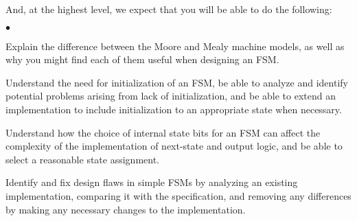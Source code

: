 And, at the highest level, we expect that you will be able to do the following:

\begin{list}{$\bullet$}{\setlength{\itemsep}{0pt}\setlength{\parskip}{0pt}%
\setlength{\topsep}{0pt}\setlength{\partopsep}{0pt}\setlength{\parsep}{0pt}}

\item{Explain the difference between the Moore and Mealy machine models, 
as well as why you might find each of them useful when designing an FSM.}
\item{Understand the need for initialization of an FSM, be able to analyze 
and identify potential problems arising from lack of initialization, and 
be able to extend an implementation to include initialization to an 
appropriate state when necessary.}
\item{Understand how the choice of internal state bits for an FSM can 
affect the complexity of the implementation of next-state and output 
logic, and be able to select a reasonable state assignment.}
\item{Identify and fix design flaws in simple FSMs by analyzing an existing 
implementation, comparing it with the specification, and removing any 
differences by making any necessary changes to the implementation.}

\end{list}

\pagebreak

\mbox{~~~} %

\vfill

\pagebreak


